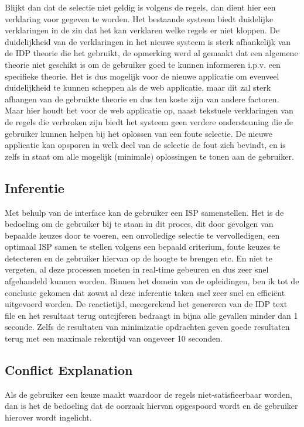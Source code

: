 Blijkt dan dat de selectie niet geldig is volgens de regels, dan dient hier een verklaring voor gegeven te worden. Het bestaande systeem biedt duidelijke verklaringen in de zin dat het kan verklaren welke regels er niet kloppen. De duidelijkheid van de verklaringen in het nieuwe systeem is sterk afhankelijk van de IDP theorie die het gebruikt, de opmerking werd al gemaakt dat een algemene theorie niet geschikt is om de gebruiker goed te kunnen informeren i.p.v. een specifieke theorie. Het is dus mogelijk voor de nieuwe applicatie om evenveel duidelijkheid te kunnen scheppen als de web applicatie, maar dit zal sterk afhangen van de gebruikte theorie en dus ten koste zijn van andere factoren. Maar hier houdt het voor de web applicatie op, naast tekstuele verklaringen van de regels die verbroken zijn biedt het systeem geen verdere ondersteuning die de gebruiker kunnen helpen bij het oplossen van een foute selectie. De nieuwe applicatie kan opsporen in welk deel van de selectie de fout zich bevindt, en is zelfs in staat om alle mogelijk (minimale) oplossingen te tonen aan de gebruiker. 



\subsection{Inferentie} 
Met behulp van de interface kan de gebruiker een ISP samenstellen. Het is de bedoeling om de gebruiker bij te staan in dit proces, dit door gevolgen van bepaalde keuzes door te voeren, een onvolledige selectie te vervolledigen, een optimaal ISP samen te stellen volgens een bepaald criterium, foute keuzes te detecteren en de gebruiker hiervan op de hoogte te brengen etc. En niet te vergeten, al deze processen moeten in real-time gebeuren en dus zeer snel afgehandeld kunnen worden. Binnen het domein van de opleidingen, ben ik tot de conclusie gekomen dat zowat al deze inferentie taken snel zeer snel en effici\"{e}nt uitgevoerd worden. De reactietijd, meegerekend het genereren van de IDP text file en het resultaat terug ontcijferen bedraagt in bijna alle gevallen minder dan 1 seconde. Zelfs de resultaten van minimizatie opdrachten geven goede resultaten terug met een maximale rekentijd van ongeveer 10 seconden. 

\subsection{Conflict Explanation} 
Als de gebruiker een keuze maakt waardoor de regels niet-satisfieerbaar worden, dan is het de bedoeling dat de oorzaak hiervan opgespoord wordt en de gebruiker hierover wordt ingelicht. 

